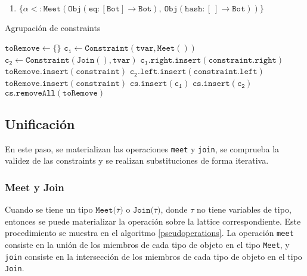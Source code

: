\begin{ej}\ \\
  \normalfont
  \label{ej3-2}
  \begin{enumerate}
    \item $\mathtt{\{\alpha <: Meet(Obj(eq : [Bot] \rightarrow Bot),\ Obj(hash : [\ ] \rightarrow Bot))\}}$
  \end{enumerate}
\end{ej}

\clearpage %
\begin{algorithm}\captionsetup{labelsep=newline}
  \centering
  \caption{Agrupación de constraints}
  \label{pseudogroup}
    \begin{algorithmic}[1]
          \State $\mathtt{toRemove\gets \{\}}$
            \State $\mathtt{c_1\gets Constraint(tvar, Meet())}$
            \State $\mathtt{c_2\gets Constraint(Join(), tvar)}$
                \State $\mathtt{c_1.right.insert(constraint.right)}$
                \State $\mathtt{toRemove.insert(constraint)}$
              \EndIf
                \State $\mathtt{c_2.left.insert(constraint.left)}$
                \State $\mathtt{toRemove.insert(constraint)}$
              \EndIf
            \EndFor
              \State $\mathtt{cs.insert(c_1)}$
            \EndIf
              \State $\mathtt{cs.insert(c_2)}$
            \EndIf
          \EndFor
          \State $\mathtt{cs.removeAll(toRemove)}$
      \EndFunction
    \end{algorithmic}
\end{algorithm}


\subsection{Unificación}
En este paso, se materializan las operaciones \texttt{meet} y \texttt{join}, se comprueba la validez de las constraints y se realizan substituciones de forma iterativa.

\subsubsection{Meet y Join}
Cuando se tiene un tipo $\mathtt{Meet(\overline{\tau}})$ o $\mathtt{Join(\overline{\tau}})$, donde $\tau$ no tiene variables de tipo, entonces se puede materializar la operación sobre la lattice correspondiente. Este procedimiento se muestra en el algoritmo \ref{pseudoperations}. La operación \texttt{meet} consiste en la unión de los miembros de cada tipo de objeto en el tipo \texttt{Meet}, y \texttt{join} consiste en la intersección de los miembros de cada tipo de objeto en el tipo \texttt{Join}.

